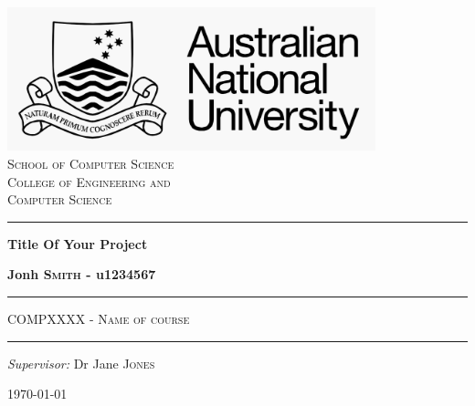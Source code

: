 \documentclass[pdftex,twoside,a4paper]{report}
\begin{document}
\begin{titlepage}
 
\begin{center}

\includegraphics[width=0.8\textwidth]{logoWhite.png}\\[0.5cm]
\textsc{\Large School of Computer Science}\\[0.5cm]
\textsc{\Large College of Engineering and}\\[0.2cm]
\textsc{\Large Computer Science}\\[0.5cm]


 
\vspace{1.4cm}

\hrule

\vspace{1.4cm}

{ \huge \bfseries Title Of Your Project} \\

\vspace{0.4cm}

{ \LARGE \bfseries Jonh \textsc{Smith} - u1234567} \\

\vspace{1.4cm}


\hrule

\vspace{1.0cm}

\textsc{\large COMPXXXX - Name of course}\\

\vspace{1.0cm}

\hrule

\vspace{1.4cm}



\emph{Supervisor: } 
Dr Jane \textsc{Jones} \\

 
\vfill
 
{\large \today}
 
\end{center}
 
\end{titlepage}
\end{document}
